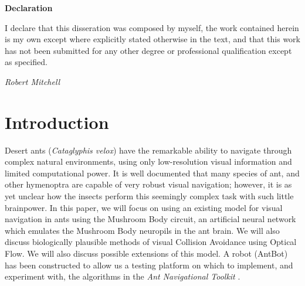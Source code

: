 \documentclass[a4paper,12pt,twoside,openright]{article}
\begin{document}
\newpage

\centering
{\LARGE\textbf{Declaration}}
\begin{flushleft}
  {\small
    I declare that this disseration was composed by myself, the work
    contained herein is my own except where explicitly stated otherwise
    in the text, and that this work has not been submitted for any other
    degree or professional qualification except as specified.
    \par 

    \textit{Robert Mitchell}}

\end{flushleft}

\newpage


\tableofcontents

\newpage

\listoffigures
\newpage

\listoftables
\newpage

\raggedright
\section{ Introduction }
Desert ants (\textit{Cataglyphis velox}) have the
remarkable ability to navigate through complex natural environments, using only low-resolution
visual information and limited computational power. It is well documented that many species of
ant, and other hymenoptra are capable of very robust visual navigation; however, it is as yet
unclear how the insects perform this seemingly complex task with such little brainpower. In this
paper, we will focus on using an existing model for visual navigation
in ants using
the Mushroom Body circuit, an artificial neural network which emulates the Mushroom Body neuropils
in the ant brain. We will also discuss biologically plausible methods of visual Collision Avoidance
using Optical Flow. We will also discuss possible extensions of this model. A robot (AntBot) has been
constructed \cite{Eberding2016} to allow us a testing platform on which to implement,
and experiment with, the algorithms in the \textit{Ant Navigational Toolkit} \cite{Wehner2009}.
\end{document}
